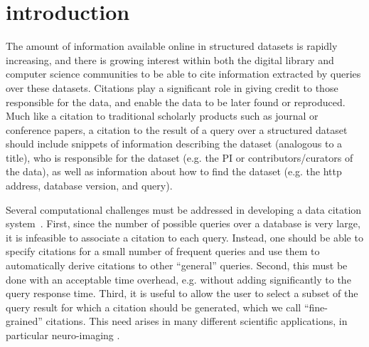 \section{introduction}\label{Sec: intro}

The amount of information available online in structured datasets is rapidly increasing, and there is growing interest within both the digital library and computer science communities to be able to cite information extracted by queries over these datasets. Citations play a significant role in giving credit to those responsible for the data, and enable the data to be later found or reproduced. Much like a citation to traditional scholarly products such as journal or conference papers, a citation to the result of a query over a structured dataset should include snippets of information describing the dataset (analogous to a title), who is responsible for the dataset (e.g. the PI or contributors/curators of the data), as well as information about how to find the dataset (e.g. the http address, database version, and query). 

Several computational challenges must be addressed in developing a data citation system~\cite{BunemanEtAl2016}.  First, since the number of possible queries over a database is very large, it is infeasible to associate a citation to each query.  Instead, one should be able to specify citations for a small number of frequent queries and use them to automatically derive citations to other ``general'' queries.  Second, this  must be done with an acceptable time overhead, e.g. without adding significantly to the query response time.  Third, it is useful to allow the user to select a subset of the query result for which a citation should be generated, which we call  ``fine-grained'' citations.  This need  arises in many different scientific applications, in particular neuro-imaging \cite{HonorEtAl2016}. 



